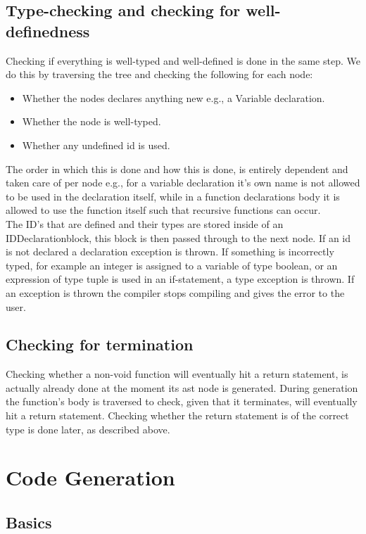 \documentclass[10pt,a4paper]{article}
\begin{document}
\subsection{Type-checking and checking for well-definedness}
Checking if everything is well-typed and well-defined is done in the same step. We do this by traversing the tree and checking the following for each node:
\begin{itemize}
\item Whether the nodes declares anything new e.g., a Variable declaration.
\item Whether the node is well-typed.
\item Whether any undefined id is used.
\end{itemize}
The order in which this is done and how this is done, is entirely dependent and taken care of per node e.g., for a variable declaration it's own name is not allowed to be used in the declaration itself, while in a function declarations body it is allowed to use the function itself such that recursive functions can occur.\\
The ID's that are defined and their types are stored inside of an IDDeclarationblock, this block is then passed through to the next node.
If an id is not declared a declaration exception is thrown. If something is incorrectly typed, for example an integer is assigned to a variable of type boolean, or an expression of type tuple is used in an if-statement, a type exception is thrown.
If an exception is thrown the compiler stops compiling and gives the error to the user.
\subsection{Checking for termination}
Checking whether a non-void function will eventually hit a return statement, is actually already done at the moment its ast node is generated. During generation the function's body is traversed to check, given that it terminates, will eventually hit a return statement. Checking whether the return statement is of the correct type is done later, as described above.



\section{Code Generation}
\subsection{Basics} %
\end{document}

